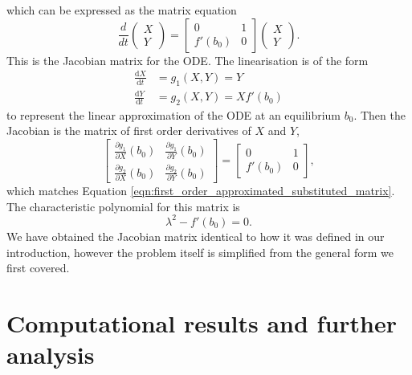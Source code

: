 which can be expressed as the matrix equation
\begin{equation}
    \frac{d}{dt}\begin{pmatrix}
        X \\
        Y
    \end{pmatrix} = \begin{bmatrix}
        0      & 1 \\
        f'(b_0) & 0
    \end{bmatrix} \begin{pmatrix}
        X \\
        Y
    \end{pmatrix}.
    \label{eqn:first_order_approximated_substituted_matrix}
\end{equation}
This is the Jacobian matrix for the ODE. The linearisation is of the form
\begin{align*}
    \frac{\mathrm{d}X}{\mathrm{d}t} &= g_1(X,Y) = Y \\
    \frac{\mathrm{d}Y}{\mathrm{d}t} &= g_2(X,Y) = Xf'(b_0) 
\end{align*}
to represent the linear approximation of the ODE at an equilibrium \(b_0\).
Then the Jacobian is the matrix of first order derivatives of $X$ and $Y$,
\begin{equation}
    \begin{bmatrix}
        \frac{\partial g_1}{\partial X}(b_0) & \frac{\partial g_1}{\partial Y}(b_0) \\
        \frac{\partial g_2}{\partial X}(b_0) & \frac{\partial g_2}{\partial Y}(b_0) 
    \end{bmatrix} = \begin{bmatrix}
        0 & 1 \\
        f'(b_0) & 0
    \end{bmatrix},
\end{equation}
which matches Equation \ref{eqn:first_order_approximated_substituted_matrix}.
The characteristic polynomial for this matrix is
\begin{equation}
	\lambda^2 - f'(b_0) = 0.
	\label{eqn:onemass_char_poly}
\end{equation}
We have obtained the Jacobian matrix identical to how it was defined in our introduction,
however the problem itself is simplified from the general form we first covered.


\section{Computational results and further analysis}

